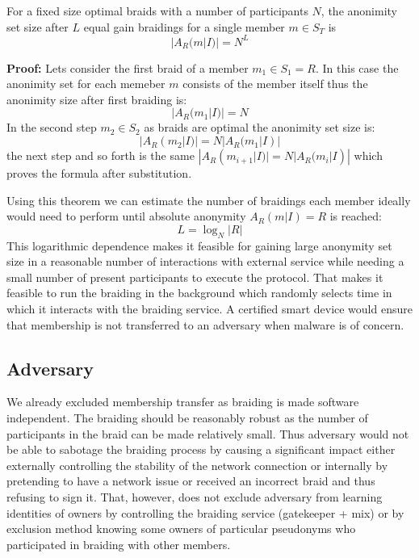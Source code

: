 \documentclass[12pt]{article}
\newenvironment{theorem}[2][Theorem]{\begin{trivlist}
\item[\hskip \labelsep {\bfseries #1}\hskip \labelsep {\bfseries #2.}]}{\end{trivlist}}
\begin{document}
\begin{theorem}{(optimal gain)}
  For a fixed size optimal braids with a number of participants $N$, the anonimity set size after $L$ equal gain braidings for a single member $m \in S_T$ is
  \begin{equation}
    |A_R(m|I)|  = N^L
  \end{equation}

  {\bf Proof:} Lets consider the first braid of a member $m_1 \in S_1 = R$. In this case the anonimity set for each memeber $m$ consists of the member itself thus the anonimity size after first braiding is:
  \begin{equation}
    |A_R(m_1|I)| = N
  \end{equation}
  In the second step $m_2 \in S_2$ as braids are optimal the anonimity set size is:
  \begin{equation}
    |A_R(m_2|I)| = N |A_R(m_1|I)|
  \end{equation}
  the next step and so forth is the same $|A_R(m_{i+1}|I)| = N |A_R(m_i|I)|$ which proves the formula after substitution.
\end{theorem}

Using this theorem we can estimate the number of braidings each member ideally would need to perform until absolute anonymity $A_R(m|I) = R$ is reached:
\begin{equation}
  L = \log_N |R| \label{eq:2}
\end{equation}
This logarithmic dependence makes it feasible for gaining large anonymity set size in a reasonable number of interactions with external service while needing a small number of present participants to execute the protocol. That makes it feasible to run the braiding in the background which randomly selects time in which it interacts with the braiding service. A certified smart device would ensure that membership is not transferred to an adversary when malware is of concern.

\subsection*{Adversary}

We already excluded membership transfer as braiding is made software independent. The braiding should be reasonably robust as the number of participants in the braid can be made relatively small. Thus adversary would not be able to sabotage the braiding process by causing a significant impact either externally controlling the stability of the network connection or internally by pretending to have a network issue or received an incorrect braid and thus refusing to sign it. That, however, does not exclude adversary from learning identities of owners by controlling the braiding service (gatekeeper + mix) or by exclusion method knowing some owners of particular pseudonyms who participated in braiding with other members.
\end{document}
